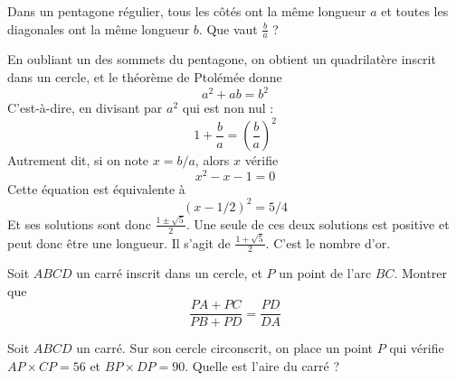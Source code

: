 \begin{exo}
Dans un pentagone régulier, tous les côtés ont la même longueur $a$ et toutes les diagonales ont la même longueur $b$. Que vaut $\frac{b}{a}$ ?
\begin{center}
\end{center}
\begin{sol}
En oubliant un des sommets du pentagone, on obtient un quadrilatère inscrit dans un cercle, et le théorème de Ptolémée donne
\[ a^2+ab=b^2\]
C'est-à-dire, en divisant par $a^2$ qui est non nul : 
\[ 1+\frac{b}{a} = \left(\frac{b}{a}\right)^2\]
Autrement dit, si on note $x=b/a$, alors $x$ vérifie
\[ x^2-x-1=0\]
Cette équation est équivalente à 
\[ (x-1/2)^2=5/4\]
Et ses solutions sont donc $\frac{1\pm \sqrt 5}{2}$. Une seule de ces deux solutions est positive et peut donc être une longueur. Il s'agit de $\frac{1+\sqrt 5}{2}$. C'est le nombre d'or.
\end{sol}
\end{exo}

\begin{exo}
Soit $ABCD$ un carré inscrit dans un cercle, et $P$ un point de l'arc $BC$. Montrer que
\[ \frac{PA+PC}{PB+PD}=\frac{PD}{DA}\]
\end{exo}

\begin{exo}
Soit $ABCD$ un carré.
Sur son cercle circonscrit, on place un point $P$ qui vérifie $AP\times CP=56$ et $BP\times DP=90$.
Quelle est l'aire du carré ? %
\end{exo}

